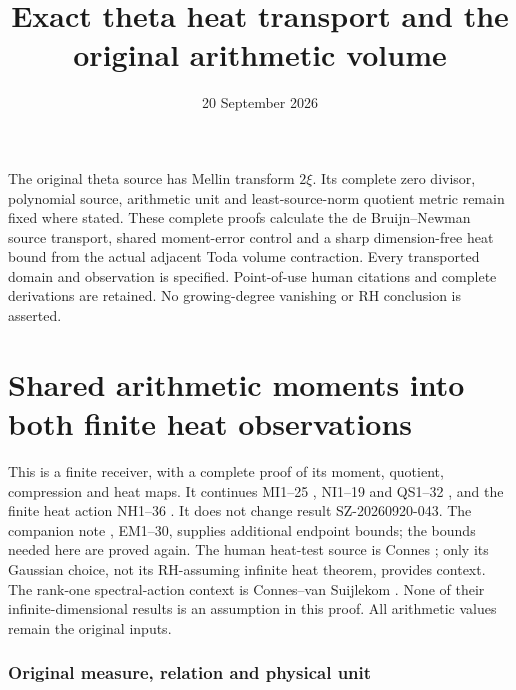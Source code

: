 \documentclass[11pt]{article}
\title{Exact theta heat transport and the original arithmetic volume}
\author{}\date{20 September 2026}
\begin{document}
\maketitle
The original theta source has Mellin transform $2\xi$. Its complete
zero divisor, polynomial source, arithmetic unit and least-source-norm
quotient metric remain fixed where stated. These complete proofs
calculate the de Bruijn--Newman source transport, shared moment-error
control and a sharp dimension-free heat bound from the actual adjacent
Toda volume contraction. Every transported domain and observation is
specified. Point-of-use human citations and complete derivations are
retained. No growing-degree vanishing or RH conclusion is asserted.


\clearpage\begingroup
\part*{Shared arithmetic moments into both finite heat observations}
\newcommand{\hrvC}{\mathbb C}\newcommand{\hrvR}{\mathbb R}
\newcommand{\hrvtr}{\operatorname{tr}}\newcommand{\hrvdd}{\dagger_G}
\newcommand{\hrvnorm}[1]{\left\lVert#1\right\rVert}
\newtheorem{hrvtheorem}{Theorem}


This is a finite receiver, with a complete proof of its moment, quotient,
compression and heat maps. It continues MI1--25 \cite{hrv:MI}, NI1--19 and
QS1--32 \cite{hrv:NI}, and the finite heat action NH1--36 \cite{hrv:NH}.
It does not change result SZ-20260920-043. The companion note
, EM1--30,
supplies additional endpoint bounds; the bounds needed here are proved
again. The human heat-test source is Connes \cite{hrv:Connes}; only its
Gaussian choice, not its RH-assuming infinite heat theorem, provides
context. The rank-one spectral-action context is Connes--van Suijlekom
\cite{hrv:CV}. None of their infinite-dimensional results is an assumption
in this proof. All arithmetic values remain the original inputs.

\section{Original measure, relation and physical unit}
\end{document}
